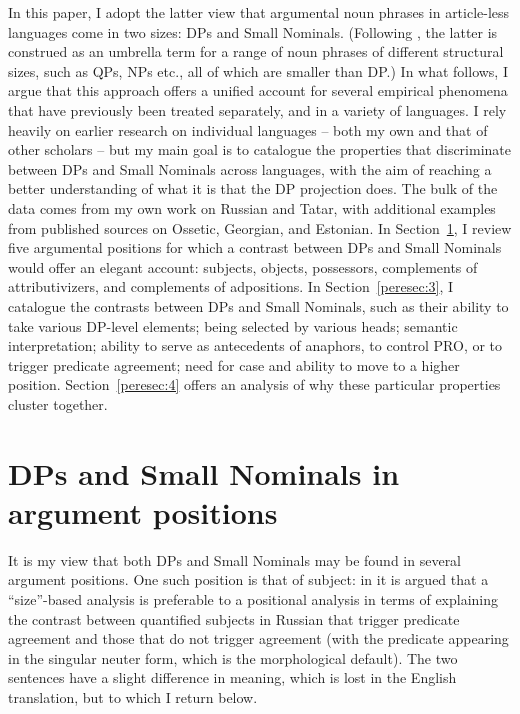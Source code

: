 \documentclass[output=paper]{langsci/langscibook}
\begin{document}
\begin{sloppypar}
In this paper, I adopt the latter view that argumental noun phrases in article-less languages come in two sizes: 
DPs and Small Nominals. 
(Following \citealt{Pereltsvaig2006}, the latter is construed as an umbrella term for a range of noun phrases of different structural sizes, 
such as QPs, NPs etc., all of which are smaller than DP.) 
In what follows, I argue that this approach offers a unified account for several empirical phenomena that have previously been treated separately, 
and in a variety of languages. 
I rely heavily on earlier research on individual languages -- both my own and that of other scholars -- but my main goal is to catalogue the properties that discriminate between DPs and Small Nominals across languages, 
with the aim of reaching a better understanding of what it is that the DP projection does. 
The bulk of the data comes from my own work on Russian and Tatar, with additional examples from published sources on Ossetic, Georgian, and Estonian. 
In Section~\ref{peresec:2}, I review five argumental positions for which a contrast between DPs and Small Nominals would offer an elegant account: 
subjects, objects, possessors, complements of attributivizers, and complements of adpositions. 
In Section~\ref{peresec:3}, I catalogue the contrasts between DPs and Small Nominals, such as their ability to take various DP-level elements; 
being selected by various heads; 
semantic interpretation; 
ability to serve as antecedents of anaphors, to control PRO, or to trigger predicate agreement; 
need for case and ability to move to a higher position. 
Section~\ref{peresec:4} offers an analysis of why these particular properties cluster together.
\end{sloppypar}

\section{DPs and Small Nominals in argument positions}
\label{peresec:2}

It is my view that both DPs and Small Nominals may be found in several argument positions. 
One such position is that of subject: 
in \citet{Pereltsvaig2006} it is argued that a ``size''-based analysis is preferable to a positional analysis 
in terms of explaining the contrast between quantified subjects in Russian that trigger predicate agreement and those that do not trigger agreement 
(with the predicate appearing in the singular neuter form, which is the morphological default). 
The two sentences have a slight difference in meaning, which is lost in the English translation, but to which I return below.
\end{document}
